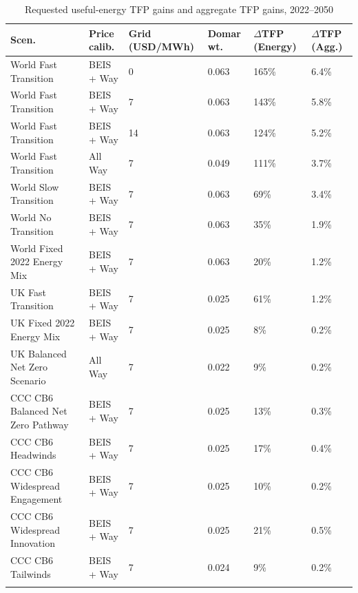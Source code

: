 \begin{longtable}{P{4cm}P{2cm}P{2cm}P{2cm}P{2.5cm}P{2cm}}
\caption{Requested useful-energy TFP gains and aggregate TFP gains, 2022--2050} \\ 
  \hline
Scen. & Price calib. & Grid (USD/MWh) & Domar wt. & $\Delta$TFP (Energy) & $\Delta$TFP (Agg.) \\ 
  \hline
World Fast Transition & BEIS + Way & 0 & 0.063 & 165\% & 6.4\% \\ 
  World Fast Transition & BEIS + Way & 7 & 0.063 & 143\% & 5.8\% \\ 
  World Fast Transition & BEIS + Way & 14 & 0.063 & 124\% & 5.2\% \\ 
  World Fast Transition & All Way & 7 & 0.049 & 111\% & 3.7\% \\ 
  World Slow Transition & BEIS + Way & 7 & 0.063 & 69\% & 3.4\% \\ 
  World No Transition & BEIS + Way & 7 & 0.063 & 35\% & 1.9\% \\ 
  World Fixed 2022 Energy Mix & BEIS + Way & 7 & 0.063 & 20\% & 1.2\% \\ 
  UK Fast Transition & BEIS + Way & 7 & 0.025 & 61\% & 1.2\% \\ 
  UK Fixed 2022 Energy Mix & BEIS + Way & 7 & 0.025 & 8\% & 0.2\% \\ 
  UK Balanced Net Zero Scenario & All Way & 7 & 0.022 & 9\% & 0.2\% \\ 
  CCC CB6 Balanced Net Zero Pathway & BEIS + Way & 7 & 0.025 & 13\% & 0.3\% \\ 
  CCC CB6 Headwinds & BEIS + Way & 7 & 0.025 & 17\% & 0.4\% \\ 
  CCC CB6 Widespread Engagement & BEIS + Way & 7 & 0.025 & 10\% & 0.2\% \\ 
  CCC CB6 Widespread Innovation & BEIS + Way & 7 & 0.025 & 21\% & 0.5\% \\ 
  CCC CB6 Tailwinds & BEIS + Way & 7 & 0.024 & 9\% & 0.2\% \\ 
   \hline
\hline
\label{tab_summary_energy_tfp_scenarios}
\end{longtable}
